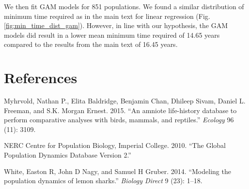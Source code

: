 \documentclass[12pt,]{article}
\begin{document}
We then fit GAM models for 851 populations. We found a similar
distribution of minimum time required as in the main text for linear
regression (Fig. \ref{fig:min_time_dist_gam}). However, in line with our
hypothesis, the GAM models did result in a lower mean minimum time
required of 14.65 years compared to the results from the main text of
16.45 years.

\clearpage

\section*{References}\label{references}

\hypertarget{refs}{}
\hypertarget{ref-Myhrvold2015}{}
Myhrvold, Nathan P., Elita Baldridge, Benjamin Chan, Dhileep Sivam,
Daniel L. Freeman, and S.K. Morgan Ernest. 2015. ``An amniote
life-history database to perform comparative analyses with birds,
mammals, and reptiles.'' \emph{Ecology} 96 (11): 3109.

\hypertarget{ref-GPDD2010}{}
NERC Centre for Population Biology, Imperial College. 2010. ``The Global
Population Dynamics Database Version 2.''

\hypertarget{ref-White2014}{}
White, Easton R, John D Nagy, and Samuel H Gruber. 2014. ``Modeling the
population dynamics of lemon sharks.'' \emph{Biology Direct} 9 (23):
1--18.
\end{document}
